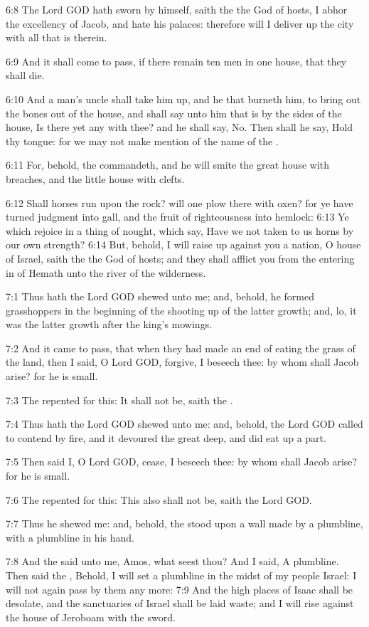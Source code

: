 6:8 The Lord GOD hath sworn by himself, saith the \LORD the God of hosts, I abhor the excellency of Jacob, and hate his palaces: therefore will I deliver up the city with all that is therein.

6:9 And it shall come to pass, if there remain ten men in one house, that they shall die.

6:10 And a man's uncle shall take him up, and he that burneth him, to bring out the bones out of the house, and shall say unto him that is by the sides of the house, Is there yet any with thee? and he shall say, No. Then shall he say, Hold thy tongue: for we may not make mention of the name of the \LORD.

6:11 For, behold, the \LORD commandeth, and he will smite the great house with breaches, and the little house with clefts.

6:12 Shall horses run upon the rock? will one plow there with oxen?  for ye have turned judgment into gall, and the fruit of righteousness into hemlock: 6:13 Ye which rejoice in a thing of nought, which say, Have we not taken to us horns by our own strength?  6:14 But, behold, I will raise up against you a nation, O house of Israel, saith the \LORD the God of hosts; and they shall afflict you from the entering in of Hemath unto the river of the wilderness.

7:1 Thus hath the Lord GOD shewed unto me; and, behold, he formed grasshoppers in the beginning of the shooting up of the latter growth; and, lo, it was the latter growth after the king's mowings.

7:2 And it came to pass, that when they had made an end of eating the grass of the land, then I said, O Lord GOD, forgive, I beseech thee: by whom shall Jacob arise? for he is small.

7:3 The \LORD repented for this: It shall not be, saith the \LORD.

7:4 Thus hath the Lord GOD shewed unto me: and, behold, the Lord GOD called to contend by fire, and it devoured the great deep, and did eat up a part.

7:5 Then said I, O Lord GOD, cease, I beseech thee: by whom shall Jacob arise? for he is small.

7:6 The \LORD repented for this: This also shall not be, saith the Lord GOD.

7:7 Thus he shewed me: and, behold, the \LORD stood upon a wall made by a plumbline, with a plumbline in his hand.

7:8 And the \LORD said unto me, Amos, what seest thou? And I said, A plumbline. Then said the \LORD, Behold, I will set a plumbline in the midst of my people Israel: I will not again pass by them any more: 7:9 And the high places of Isaac shall be desolate, and the sanctuaries of Israel shall be laid waste; and I will rise against the house of Jeroboam with the sword.

